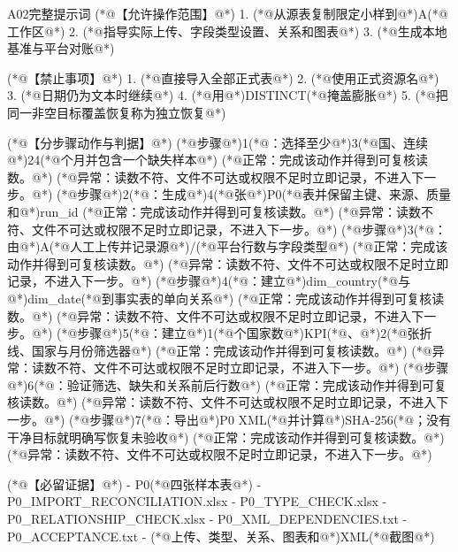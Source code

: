 \documentclass[UTF8,openany,zihao=-4]{ctexbook}
\renewcommand{\_}{\textunderscore\allowbreak}
\begin{document}
\begin{PromptBox}{A02完整提示词}
(*@{\promptcjk 【允许操作范围】}@*)
1. (*@{\promptcjk 从源表复制限定小样到}@*)A(*@{\promptcjk 工作区}@*)
2. (*@{\promptcjk 指导实际上传、字段类型设置、关系和图表}@*)
3. (*@{\promptcjk 生成本地基准与平台对账}@*)

(*@{\promptcjk 【禁止事项】}@*)
1. (*@{\promptcjk 直接导入全部正式表}@*)
2. (*@{\promptcjk 使用正式资源名}@*)
3. (*@{\promptcjk 日期仍为文本时继续}@*)
4. (*@{\promptcjk 用}@*)DISTINCT(*@{\promptcjk 掩盖膨胀}@*)
5. (*@{\promptcjk 把同一非空目标覆盖恢复称为独立恢复}@*)

(*@{\promptcjk 【分步骤动作与判据】}@*)
(*@{\promptcjk 步骤}@*)1(*@{\promptcjk ：选择至少}@*)3(*@{\promptcjk 国、连续}@*)24(*@{\promptcjk 个月并包含一个缺失样本}@*)
  (*@{\promptcjk 正常：完成该动作并得到可复核读数。}@*)
  (*@{\promptcjk 异常：读数不符、文件不可达或权限不足时立即记录，不进入下一步。}@*)
(*@{\promptcjk 步骤}@*)2(*@{\promptcjk ：生成}@*)4(*@{\promptcjk 张}@*)P0(*@{\promptcjk 表并保留主键、来源、质量和}@*)run_id
  (*@{\promptcjk 正常：完成该动作并得到可复核读数。}@*)
  (*@{\promptcjk 异常：读数不符、文件不可达或权限不足时立即记录，不进入下一步。}@*)
(*@{\promptcjk 步骤}@*)3(*@{\promptcjk ：由}@*)A(*@{\promptcjk 人工上传并记录源}@*)/(*@{\promptcjk 平台行数与字段类型}@*)
  (*@{\promptcjk 正常：完成该动作并得到可复核读数。}@*)
  (*@{\promptcjk 异常：读数不符、文件不可达或权限不足时立即记录，不进入下一步。}@*)
(*@{\promptcjk 步骤}@*)4(*@{\promptcjk ：建立}@*)dim_country(*@{\promptcjk 与}@*)dim_date(*@{\promptcjk 到事实表的单向关系}@*)
  (*@{\promptcjk 正常：完成该动作并得到可复核读数。}@*)
  (*@{\promptcjk 异常：读数不符、文件不可达或权限不足时立即记录，不进入下一步。}@*)
(*@{\promptcjk 步骤}@*)5(*@{\promptcjk ：建立}@*)1(*@{\promptcjk 个国家数}@*)KPI(*@{\promptcjk 、}@*)2(*@{\promptcjk 张折线、国家与月份筛选器}@*)
  (*@{\promptcjk 正常：完成该动作并得到可复核读数。}@*)
  (*@{\promptcjk 异常：读数不符、文件不可达或权限不足时立即记录，不进入下一步。}@*)
(*@{\promptcjk 步骤}@*)6(*@{\promptcjk ：验证筛选、缺失和关系前后行数}@*)
  (*@{\promptcjk 正常：完成该动作并得到可复核读数。}@*)
  (*@{\promptcjk 异常：读数不符、文件不可达或权限不足时立即记录，不进入下一步。}@*)
(*@{\promptcjk 步骤}@*)7(*@{\promptcjk ：导出}@*)P0 XML(*@{\promptcjk 并计算}@*)SHA-256(*@{\promptcjk ；没有干净目标就明确写恢复未验收}@*)
  (*@{\promptcjk 正常：完成该动作并得到可复核读数。}@*)
  (*@{\promptcjk 异常：读数不符、文件不可达或权限不足时立即记录，不进入下一步。}@*)

(*@{\promptcjk 【必留证据】}@*)
- P0(*@{\promptcjk 四张样本表}@*)
- P0_IMPORT_RECONCILIATION.xlsx
- P0_TYPE_CHECK.xlsx
- P0_RELATIONSHIP_CHECK.xlsx
- P0_XML_DEPENDENCIES.txt
- P0_ACCEPTANCE.txt
- (*@{\promptcjk 上传、类型、关系、图表和}@*)XML(*@{\promptcjk 截图}@*)


\end{PromptBox}
\end{document}
